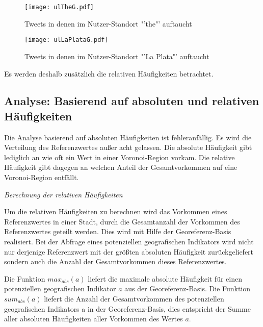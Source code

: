			\begin{figure} 
				\begin{center}
					\texttt{[image: ulTheG.pdf]}
					\caption{Tweets in denen im Nutzer-Standort "'the"' auftaucht}
					\label{img:ULThe}
					\end{center}
				\end{figure}
			\begin{figure}

			\begin{center}
					\texttt{[image: ulLaPlataG.pdf]}
					\caption{Tweets in denen im Nutzer-Standort "'La Plata"' auftaucht}
					\label{img:ULlaPlata}
				\end{center}
			\end{figure}	


			Es werden deshalb zusätzlich die relativen Häufigkeiten betrachtet.	

		\subsection{Analyse: Basierend auf absoluten und relativen Häufigkeiten} 

			Die Analyse basierend auf absoluten Häufigkeiten ist fehleranfällig. 
			Es wird die Verteilung des Referenzwertes außer acht gelassen.
			Die absolute Häufigkeit gibt lediglich an wie oft ein Wert in einer Voronoi-Region vorkam.
			Die relative Häufigkeit gibt dagegen an welchen Anteil der Gesamtvorkommen auf eine Voronoi-Region entfällt.

			\textit{Berechnung der relativen Häufigkeiten} 

				Um die relativen Häufigkeiten zu berechnen wird das Vorkommen eines Referenzwertes in einer Stadt, durch die Gesamtanzahl der Vorkommen des Referenzwertes geteilt werden.
				Dies wird mit Hilfe der Georeferenz-Basis realisiert.
				Bei der Abfrage eines potenziellen geografischen Indikators wird nicht nur derjenige Referenzwert mit der größten absoluten Häufigkeit zurückgeliefert sondern auch die Anzahl der Gesamtvorkommen dieses Referenzwertes.

				Die Funktion $max_{abs}(a)$ liefert die maximale absolute Häufigkeit für einen potenziellen geografischen Indikator $a$ aus der Georeferenz-Basis.
				Die Funktion $sum_{abs}(a)$ liefert die Anzahl der Gesamtvorkommen des potenziellen geografischen Indikators a in der Georeferenz-Basis, dies entspricht der Summe aller absoluten Häufigkeiten aller Vorkommen des Wertes $a$.

